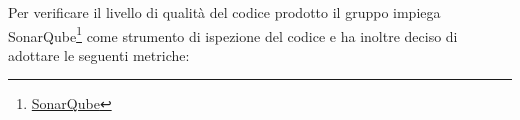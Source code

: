%
Per verificare il livello di qualità del codice prodotto il gruppo \groupName{} impiega SonarQube\footnote{\href{https://www.sonarqube.org/}{SonarQube}} come strumento di ispezione del codice e ha inoltre deciso di adottare le seguenti metriche:
